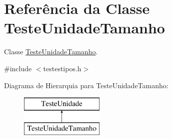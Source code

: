 \hypertarget{class_teste_unidade_tamanho}{
\section{\-Referência da \-Classe \-Teste\-Unidade\-Tamanho}
\label{class_teste_unidade_tamanho}
}


\-Classe \hyperlink{class_teste_unidade_tamanho}{\-Teste\-Unidade\-Tamanho}.  




{\ttfamily \#include $<$testestipos.\-h$>$}

\-Diagrama de \-Hierarquia para \-Teste\-Unidade\-Tamanho\-:\begin{figure}[H]
\begin{center}
\leavevmode
\includegraphics[height=2.000000cm]{class_teste_unidade_tamanho}
\end{center}
\end{figure}
